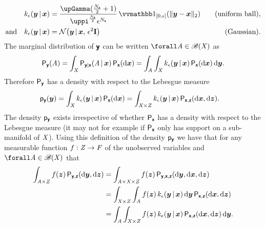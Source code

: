 \begin{align}
\label{eq:uniform-ball-abc-kernel}
  k_\epsilon(\vct{y}\gvn\vct{x}) &=
  \frac{\upGamma(\frac{N_{\rvct{x}}}{2}+1)}{\uppi^{\frac{N_{\rvct{x}}}{2}} \epsilon^{N_{\rvct{x}}}} 
  \ind{[0,\epsilon]}\lpa\Vert\vct{y} - \vct{x}\Vert_2\rpa & 
  \quad \textrm{(uniform ball)},\\
\label{eq:gaussian-abc-kernel}
  \textrm{and}\quad
  k_\epsilon(\vct{y}\gvn\vct{x}) &= 
  \nrm{\vct{y}\gvn\vct{x},\,\epsilon^2\idmtx} &
  \quad \textrm{(Gaussian)}. 
\end{align}
The marginal distribution of $\boldsymbol{\mathsf{y}}$ can be written $\forall \set{A} \in \borel(\set{X})$ as
\begin{equation}
  \prob{\rvct{y}}(\set{A}) = 
  \int_{\set{X}} \prob{\rvct{y}|\rvct{x}}\lpa \set{A} \gvn \vct{x} \rpa
  \,\prob{\rvct{x}}(\dr \vct{x})
  =
  \int_{\set{A}} \int_{\set{X}}
    k_\epsilon(\vct{y}\gvn\vct{x})\,
  \prob{\rvct{x}}(\dr \vct{x})\,\dr\vct{y}.
\end{equation}
Therefore $\mathsf{P}_{\boldsymbol{\mathsf{y}}}$ has a density with respect to the Lebesgue measure
\begin{equation}\label{eq:abc-marginal-density}
\begin{split}
  \mathsf{p}_{\boldsymbol{\mathsf{y}}}(\boldsymbol{y})
  &=
  \int_{\mathit{X}}
    k_\epsilon(\boldsymbol{y}\operatorname{|}\boldsymbol{x})\,
  \mathsf{P}_{\boldsymbol{\mathsf{x}}}(\mathrm{d} \boldsymbol{x})
  =
  \int_{\mathit{X}\times\mathit{Z}}
    k_\epsilon(\boldsymbol{y}\operatorname{|}\boldsymbol{x})\,
  \mathsf{P}_{\boldsymbol{\mathsf{x}},\boldsymbol{\mathsf{z}}}(\mathrm{d} \boldsymbol{x},\mathrm{d} \boldsymbol{z}).
\end{split}
\end{equation}
The density $\mathsf{p}_{\boldsymbol{\mathsf{y}}}$ exists irrespective of whether $\mathsf{P}_{\boldsymbol{\mathsf{x}}}$ has a density with respect to the Lebesgue measure (it may not for example if $\mathsf{P}_{\boldsymbol{\mathsf{x}}}$ only has support on a sub-manifold of $\mathit{X}$). Using this definition of the density $\mathsf{p}_{\boldsymbol{\mathsf{y}}}$ we have that for any measurable function $f : \mathit{Z} \to \mathit{F}$ of the unobserved variables and $\forall \set{A} \in \borel(\set{X})$ that
\begin{equation}
  \label{eq:abc-conditional-expectation-derivation-1}
\begin{split}
  \int_{\mathit{A} \times \mathit{Z}} 
    f(\boldsymbol{z}) 
  \,\mathsf{P}_{\boldsymbol{\mathsf{y}},\boldsymbol{\mathsf{z}}}(\mathrm{d} \boldsymbol{y},\mathrm{d} \boldsymbol{z}) 
  &=
  \int_{\mathit{A} \times \mathit{X} \times \mathit{Z}} 
    f(\boldsymbol{z}) 
  \,\mathsf{P}_{\boldsymbol{\mathsf{y}},\boldsymbol{\mathsf{x}},\boldsymbol{\mathsf{z}}}(\mathrm{d}\boldsymbol{y},\mathrm{d}\boldsymbol{x},\mathrm{d}\boldsymbol{z})
  \\
  &=
  \int_{\mathit{X} \times \mathit{Z}} \int_{\mathit{A}}
    f(\boldsymbol{z})\,
    k_{\epsilon}(\boldsymbol{y}\operatorname{|}\boldsymbol{x})
  \,\mathrm{d}\boldsymbol{y}
  \,\mathsf{P}_{\boldsymbol{\mathsf{x}},\boldsymbol{\mathsf{z}}}(\mathrm{d}\boldsymbol{x},\mathrm{d}\boldsymbol{z})
  \\
  &=
  \int_{\mathit{A}} \int_{\mathit{X} \times \mathit{Z}} 
    f(\boldsymbol{z})\,
    k_{\epsilon}(\boldsymbol{y}\operatorname{|}\boldsymbol{x})
  \,\mathsf{P}_{\boldsymbol{\mathsf{x}},\boldsymbol{\mathsf{z}}}(\mathrm{d}\boldsymbol{x},\mathrm{d}\boldsymbol{z})
 \,\mathrm{d}\boldsymbol{y}.
\end{split}
\end{equation}
